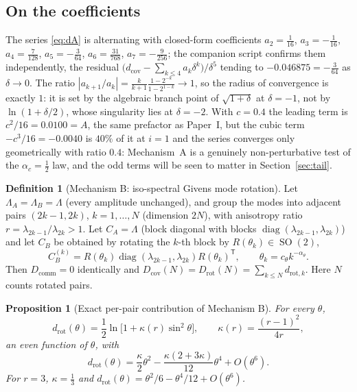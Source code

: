 \documentclass[11pt,reqno]{amsart}
\theoremstyle{plain}
\newtheorem{proposition}[theorem]{Proposition}
\theoremstyle{definition}
\newtheorem{definition}[theorem]{Definition}
\theoremstyle{remark}
\numberwithin{equation}{section}
\DeclareMathOperator{\diag}{diag}
\DeclareMathOperator{\SO}{SO}
\newcommand{\Dcov}{D_{\mathrm{cov}}}
\newcommand{\Dcomm}{D_{\mathrm{comm}}}
\newcommand{\Drot}{D_{\mathrm{rot}}}
\newcommand{\CA}{C_A}
\newcommand{\CB}{C_B}
\begin{document}
\subsection*{On the coefficients}
The series \eqref{eq:dA} is alternating with closed-form coefficients $a_2=\tfrac1{16}$, $a_3=-\tfrac1{16}$, $a_4=\tfrac7{128}$, $a_5=-\tfrac3{64}$, $a_6=\tfrac{31}{768}$, $a_7=-\tfrac9{256}$; the companion script confirms them independently, the residual $\bigl(d_{\mathrm{cov}}-\sum_{k\le4}a_k\delta^k\bigr)/\delta^5$ tending to $-0.046875=-\tfrac3{64}$ as $\delta\to0$. The ratio $|a_{k+1}/a_k|=\frac{k}{k+1}\frac{1-2^{-k}}{1-2^{1-k}}\to1$, so the radius of convergence is exactly $1$: it is set by the algebraic branch point of $\sqrt{1+\delta}$ at $\delta=-1$, not by $\ln(1+\delta/2)$, whose singularity lies at $\delta=-2$. With $c=0.4$ the leading term is $c^2/16=0.0100=A$, the same prefactor as Paper~I, but the cubic term $-c^3/16=-0.0040$ is $40\%$ of it at $i=1$ and the series converges only geometrically with ratio $0.4$: Mechanism~A is a genuinely non-perturbative test of the $\alpha_c=\tfrac12$ law, and the odd terms will be seen to matter in Section~\ref{sec:tail}.

\begin{definition}[Mechanism B: iso-spectral Givens mode rotation]\label{def:B}
Let $\Lambda_A=\Lambda_B=\Lambda$ (every amplitude unchanged), and group the modes into adjacent pairs $(2k-1,2k)$, $k=1,\dots,N$ (dimension $2N$), with anisotropy ratio $r=\lambda_{2k-1}/\lambda_{2k}>1$. Let $\CA=\Lambda$ (block diagonal with blocks $\diag(\lambda_{2k-1},\lambda_{2k})$) and let $\CB$ be obtained by rotating the $k$-th block by $R(\theta_k)\in\SO(2)$,
\begin{equation}\label{eq:mechB}
\CB^{(k)}=R(\theta_k)\diag(\lambda_{2k-1},\lambda_{2k})R(\theta_k)^{\mathsf T},\qquad \theta_k=c_\theta k^{-\alpha_\theta}.
\end{equation}
Then $\Dcomm=0$ identically and $\Dcov(N)=\Drot(N)=\sum_{k\le N}d_{\mathrm{rot},k}$. Here $N$ counts rotated pairs.
\end{definition}

\begin{proposition}[Exact per-pair contribution of Mechanism B]\label{prop:B}
For every $\theta$,
\begin{equation}\label{eq:dB}
d_{\mathrm{rot}}(\theta)=\frac12\ln\bigl[1+\kappa(r)\sin^2\theta\bigr],\qquad \kappa(r)=\frac{(r-1)^2}{4r},
\end{equation}
an even function of $\theta$, with
\begin{equation}\label{eq:dBexp}
d_{\mathrm{rot}}(\theta)=\frac{\kappa}{2}\theta^2-\frac{\kappa(2+3\kappa)}{12}\theta^4+O(\theta^6).
\end{equation}
For $r=3$, $\kappa=\tfrac13$ and $d_{\mathrm{rot}}(\theta)=\theta^2/6-\theta^4/12+O(\theta^6)$.
\end{proposition}
\end{document}
